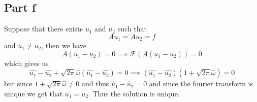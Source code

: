 \documentclass[12pt]{report}
\begin{document}
\subsection*{Part f}
Suppose that there exists $u_1$ and $u_2$ such that
\begin{equation*}
    Au_1 = Au_2 = f
\end{equation*}
and $u_1 \neq u_2$, then we have 
\begin{equation*}
    A(u_1 - u_2) = 0 \implies \mathcal{F}(A(u_1 - u_2)) = 0
\end{equation*}
which gives us
\begin{equation*}
    \hat{u_1} - \hat{u_2} + \sqrt{2\pi}\hat{\omega}(\hat{u_1} - \hat{u_2}) = 0 \implies (\hat{u_1} - \hat{u_2})(1 + \sqrt{2\pi}\hat{\omega}) = 0
\end{equation*}
but since $1 + \sqrt{2\pi}\hat{\omega} \neq 0$ and thus $\hat{u}_1 - \hat{u}_2 = 0$ and since the fourier transform is unique we get that $u_1 = u_2$. Thus the solution is unique.
\end{document}
